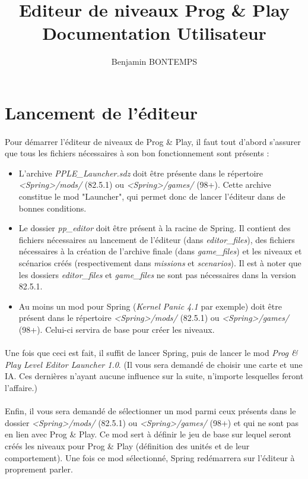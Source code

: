 \documentclass[a4paper]{article}
\title{Editeur de niveaux Prog \& Play\\ Documentation Utilisateur}
\author{Benjamin BONTEMPS}
\begin{document}
\maketitle

\tableofcontents

\newpage

\section{Lancement de l'éditeur}
\paragraph{ }
Pour démarrer l'éditeur de niveaux de Prog \& Play, il faut tout d'abord s'assurer que tous les fichiers nécessaires à son bon fonctionnement sont présents :
\begin{itemize}
\item L'archive \textit{PPLE\_Launcher.sdz} doit être présente dans le répertoire \textit{<Spring>/mods/} (82.5.1) ou \textit{<Spring>/games/} (98+). Cette archive constitue le mod "Launcher", qui permet donc de lancer l'éditeur dans de bonnes conditions.
\item Le dossier \textit{pp\_editor} doit être présent à la racine de Spring. Il contient des fichiers nécessaires au lancement de l'éditeur (dans \textit{editor\_files}), des fichiers nécessaires à la création de l'archive finale (dans \textit{game\_files}) et les niveaux et scénarios créés (respectivement dans \textit{missions} et \textit{scenarios}). Il est à noter que les dossiers \textit{editor\_files} et \textit{game\_files} ne sont pas nécessaires dans la version 82.5.1.
\item Au moins un mod pour Spring (\textit{Kernel Panic 4.1} par exemple) doit être présent dans le répertoire \textit{<Spring>/mods/} (82.5.1) ou \textit{<Spring>/games/} (98+). Celui-ci servira de base pour créer les niveaux.
\end{itemize}
\paragraph{ }
Une fois que ceci est fait, il suffit de lancer Spring, puis de lancer le mod \textit{Prog \& Play Level Editor Launcher 1.0}. (Il vous sera demandé de choisir une carte et une IA. Ces dernières n'ayant aucune influence sur la suite, n'importe lesquelles feront l'affaire.)
\paragraph{ }
Enfin, il vous sera demandé de sélectionner un mod parmi ceux présents dans le dossier \textit{<Spring>/mods/} (82.5.1) ou \textit{<Spring>/games/} (98+) et qui ne sont pas en lien avec Prog \& Play. Ce mod sert à définir le jeu de base sur lequel seront créés les niveaux pour Prog \& Play (définition des unités et de leur comportement). Une fois ce mod sélectionné, Spring redémarrera sur l'éditeur à proprement parler.
\end{document}
